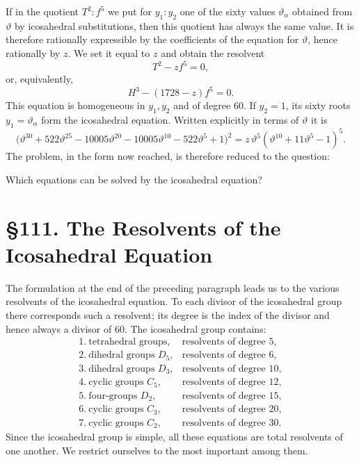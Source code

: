 \documentclass[11pt,a4paper]{book}
\newcommand{\webersection}[2]{\clearpage\section*{\S #1. #2}}
\begin{document}
If in the quotient $T^2:f^5$ we put for $y_1:y_2$ one of the sixty values $\vartheta_\alpha$ obtained from $\vartheta$ by icosahedral substitutions, then this quotient has always the same value.  It is therefore rationally expressible by the coefficients of the equation for $\vartheta$, hence rationally by $z$.  We set it equal to $z$ and obtain the resolvent
\begin{equation}
 T^2-zf^5=0,
\end{equation}
or, equivalently,
\begin{equation}
 H^3-(1728-z)f^5=0.
\end{equation}
This equation is homogeneous in $y_1,y_2$ and of degree $60$.  If $y_2=1$, its sixty roots $y_1=\vartheta_\alpha$ form the icosahedral equation.  Written explicitly in terms of $\vartheta$ it is
\begin{equation}
 \bigl(\vartheta^{30}+522\vartheta^{25}-10005\vartheta^{20}
      -10005\vartheta^{10}-522\vartheta^5+1\bigr)^2
 =z\,\vartheta^5(\vartheta^{10}+11\vartheta^5-1)^5.
\end{equation}
The problem, in the form now reached, is therefore reduced to the question:

Which equations can be solved by the icosahedral equation?

\webersection{111}{The Resolvents of the Icosahedral Equation}

The formulation at the end of the preceding paragraph leads us to the various resolvents of the icosahedral equation.  To each divisor of the icosahedral group there corresponds such a resolvent; its degree is the index of the divisor and hence always a divisor of $60$.  The icosahedral group contains:
\[
\begin{array}{ll}
1.\ \text{tetrahedral groups},& \text{resolvents of degree }5,\\
2.\ \text{dihedral groups }D_5,& \text{resolvents of degree }6,\\
3.\ \text{dihedral groups }D_3,& \text{resolvents of degree }10,\\
4.\ \text{cyclic groups }C_5,& \text{resolvents of degree }12,\\
5.\ \text{four-groups }D_2,& \text{resolvents of degree }15,\\
6.\ \text{cyclic groups }C_3,& \text{resolvents of degree }20,\\
7.\ \text{cyclic groups }C_2,& \text{resolvents of degree }30.
\end{array}
\]
Since the icosahedral group is simple, all these equations are total resolvents of one another.  We restrict ourselves to the most important among them.
\end{document}
